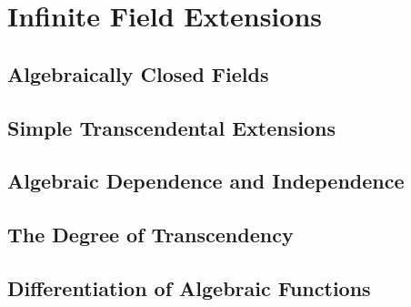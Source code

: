 \section{Infinite Field Extensions}

\subsection{Algebraically Closed Fields}

\subsection{Simple Transcendental Extensions}

\subsection{Algebraic Dependence and Independence}

\subsection{The Degree of Transcendency}

\subsection{Differentiation of Algebraic Functions}